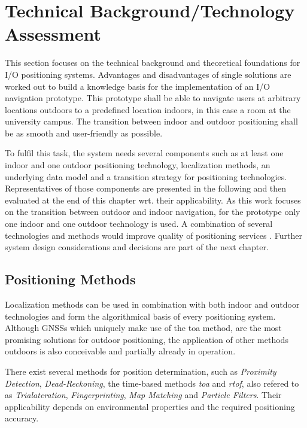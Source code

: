 \chapter{Technical Background/Technology Assessment}

This section focuses on the technical background and theoretical foundations for I/O positioning systems. Advantages and disadvantages of single solutions are worked out to build a knowledge basis for the implementation of an I/O navigation prototype.
This prototype shall be able to navigate users at arbitrary locations outdoors to a predefined location indoors, in this case a room at the university campus. The transition between indoor and outdoor positioning shall be as smooth and user-friendly as possible.

To fulfil this task, the system needs several components such as at least one indoor and one outdoor positioning technology, localization methods, an underlying data model and a transition strategy for positioning technologies.
Representatives of those components are presented in the following and then evaluated at the end of this chapter wrt. their applicability. As this work focuses on the transition between outdoor and indoor navigation, for the prototype only one indoor and one outdoor technology is used. A combination of several technologies and methods would improve quality of positioning services \cite{challengesLBS}.
Further system design considerations and decisions are part of the next chapter. 


\section{Positioning Methods}

Localization methods can be used in combination with both indoor and outdoor technologies and form the algorithmical basis of every positioning system.
Although GNSSs which uniquely make use of the \ac{toa} method, are the most promising solutions for outdoor positioning, the application of other methods outdoors is also conceivable and partially already in operation.

There exist several methods for position determination, such as \textit{Proximity Detection}, \textit{Dead-Reckoning}, the time-based methods \textit{\ac{toa}} and \textit{\ac{rtof}}, also refered to as \textit{Trialateration}, \textit{Fingerprinting}, \textit{Map Matching} and \textit{Particle Filters}. 
Their applicability depends on environmental properties and the required positioning accuracy.

